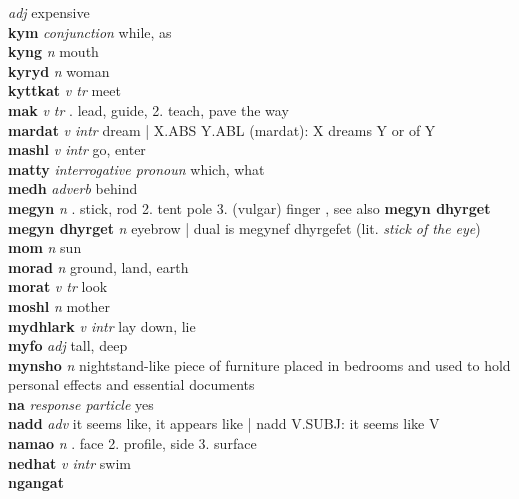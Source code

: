   \emph{adj} \textperiodcentered expensive\\\textbf{kym}   \emph{conjunction} \textperiodcentered while, as\\\textbf{kyng}   \emph{n} \textperiodcentered mouth\\\textbf{kyryd}   \emph{n} \textperiodcentered woman\\\textbf{kyttkat}   \emph{v tr} \textperiodcentered meet\\\textbf{mak}   \emph{v tr} . lead, guide, 2. teach, pave the way \\\textbf{mardat}   \emph{v intr} \textperiodcentered dream | X.ABS Y.ABL (mardat): X dreams Y or of Y\\\textbf{mashl}   \emph{v intr} \textperiodcentered go, enter\\\textbf{matty}   \emph{interrogative pronoun} \textperiodcentered which, what\\\textbf{medh}   \emph{adverb} \textperiodcentered behind\\\textbf{megyn}   \emph{n} . stick, rod 2. tent pole 3. (vulgar) finger , see also \textbf{megyn dhyrget}\\\textbf{megyn dhyrget}   \emph{n} \textperiodcentered eyebrow | dual is megynef dhyrgefet (lit. \emph{stick of the eye})\\\textbf{mom}   \emph{n} \textperiodcentered sun\\\textbf{morad}   \emph{n} \textperiodcentered ground, land, earth\\\textbf{morat}   \emph{v tr} \textperiodcentered look\\\textbf{moshl}   \emph{n} \textperiodcentered mother\\\textbf{mydhlark}   \emph{v intr} \textperiodcentered lay down, lie\\\textbf{myfo}   \emph{adj} \textperiodcentered tall, deep\\\textbf{mynsho}   \emph{n} \textperiodcentered nightstand-like piece of furniture placed in bedrooms and used to hold personal effects and essential documents\\\textbf{na}   \emph{response particle} \textperiodcentered yes\\\textbf{nadd}   \emph{adv} \textperiodcentered it seems like, it appears like | nadd V.SUBJ: it seems like V\\\textbf{namao}   \emph{n} . face 2. profile, side 3. surface \\\textbf{nedhat}   \emph{v intr} \textperiodcentered swim\\\textbf{ngangat}  